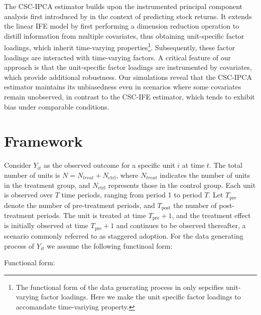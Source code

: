 \documentclass[12pt]{article}
\begin{document}
The CSC-IPCA estimator builds upon the instrumented principal component analysis first introduced by \cite{kelly2020instrumented, kelly2019characteristics} in the context of predicting stock returns. It extends the linear IFE model by first performing a dimension reduction operation to distill information from multiple covariates, thus obtaining unit-specific factor loadings, which inherit time-varying properties\footnote{The functional form of the data generating process in \cite{xu2017generalized} only sepcifies unit-varying factor loadings. Here we make the unit specific factor loadings to accomandate time-variying property.}. Subsequently, these factor loadings are interacted with time-varying factors. A critical feature of our approach is that the unit-specific factor loadings are instrumented by covariates, which provide additional robustness. Our simulations reveal that the CSC-IPCA estimator maintains its unbiasedness even in scenarios where some covariates remain unobserved, in contrast to the CSC-IFE estimator, which tends to exhibit bias under comparable conditions.






 
\section{Framework} 
\label{sec: framework}

Consider $Y_{it}$ as the observed outcome for a specific unit $i$ at time $t$. The total number of units is $N = N_{treat} + N_{\text{ctrl}}$, where $N_{treat}$ indicates the number of units in the treatment group, and $N_{\text{ctrl}}$ represents those in the control group. Each unit is observed over $T$ time periods, ranging from period 1 to period $T$. Let $T_{\text{pre}}$ denote the number of pre-treatment periods, and $T_{\text{post}}$ the number of post-treatment periods. The unit is treated at time $T_{\text{pre}} + 1$, and the treatment effect is initially observed at time $T_{\text{pre}} + 1$ and continues to be observed thereafter, a scenario commonly referred to as staggered adoption. For the data generating process of $Y_{it}$ we assume the following functinoal form:

\begin{assumption}
Functional form:
\label{ass: function}
\end{assumption}
\end{document}
